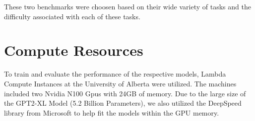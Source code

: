 \documentclass[\main/thesis.tex]{subfiles}
\begin{document}
These two benchmarks were choosen based on their wide variety of tasks and the difficulty 
associated with each of these tasks. 


\section{Compute Resources}\label{sec:computeResources}
To train and evaluate the performance of the respective models, Lambda Compute Instances at
the University of Alberta were utilized. The machines included two Nvidia N100 Gpus with 24GB
of memory. Due to the large size of the GPT2-XL Model (5.2 Billion Parameters), we also 
utilized the DeepSpeed library from Microsoft to help fit the models within the GPU memory. 
\end{document}
